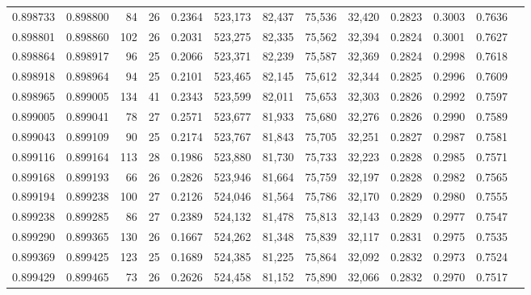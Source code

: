 \begin{tabular}{rrrrrrrrrrrrr}
0.898733 & 0.898800 &    84 &  26 &                                     0.2364 & 523,173 &  82,437 &  75,536 &  32,420 & 0.2823 & 0.3003 & 0.7636 \\
0.898801 & 0.898860 &   102 &  26 &                                     0.2031 & 523,275 &  82,335 &  75,562 &  32,394 & 0.2824 & 0.3001 & 0.7627 \\
0.898864 & 0.898917 &    96 &  25 &                                     0.2066 & 523,371 &  82,239 &  75,587 &  32,369 & 0.2824 & 0.2998 & 0.7618 \\
0.898918 & 0.898964 &    94 &  25 &                                     0.2101 & 523,465 &  82,145 &  75,612 &  32,344 & 0.2825 & 0.2996 & 0.7609 \\
0.898965 & 0.899005 &   134 &  41 &                                     0.2343 & 523,599 &  82,011 &  75,653 &  32,303 & 0.2826 & 0.2992 & 0.7597 \\
0.899005 & 0.899041 &    78 &  27 &                                     0.2571 & 523,677 &  81,933 &  75,680 &  32,276 & 0.2826 & 0.2990 & 0.7589 \\
0.899043 & 0.899109 &    90 &  25 &                                     0.2174 & 523,767 &  81,843 &  75,705 &  32,251 & 0.2827 & 0.2987 & 0.7581 \\
0.899116 & 0.899164 &   113 &  28 &                                     0.1986 & 523,880 &  81,730 &  75,733 &  32,223 & 0.2828 & 0.2985 & 0.7571 \\
0.899168 & 0.899193 &    66 &  26 &                                     0.2826 & 523,946 &  81,664 &  75,759 &  32,197 & 0.2828 & 0.2982 & 0.7565 \\
0.899194 & 0.899238 &   100 &  27 &                                     0.2126 & 524,046 &  81,564 &  75,786 &  32,170 & 0.2829 & 0.2980 & 0.7555 \\
0.899238 & 0.899285 &    86 &  27 &                                     0.2389 & 524,132 &  81,478 &  75,813 &  32,143 & 0.2829 & 0.2977 & 0.7547 \\
0.899290 & 0.899365 &   130 &  26 &                                     0.1667 & 524,262 &  81,348 &  75,839 &  32,117 & 0.2831 & 0.2975 & 0.7535 \\
0.899369 & 0.899425 &   123 &  25 &                                     0.1689 & 524,385 &  81,225 &  75,864 &  32,092 & 0.2832 & 0.2973 & 0.7524 \\
0.899429 & 0.899465 &    73 &  26 &                                     0.2626 & 524,458 &  81,152 &  75,890 &  32,066 & 0.2832 & 0.2970 & 0.7517 \\

\end{tabular}

